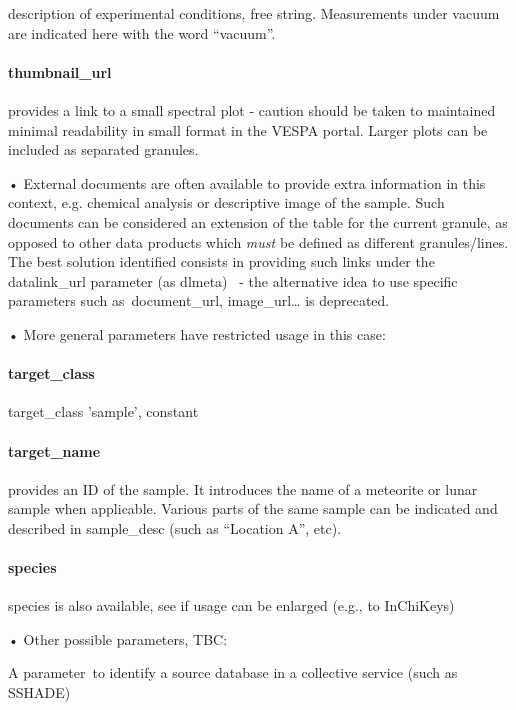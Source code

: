\documentclass[11pt,a4paper]{ivoa}
\begin{document}
description of experimental conditions, free string. Measurements under vacuum are indicated here with the word ``vacuum''.

\paragraph{\textbf{thumbnail\_url}}

provides a link to a small spectral plot - caution should be taken to maintained minimal readability in small format in the VESPA portal. Larger plots can be included as separated granules.

• External documents are often available to provide extra information in this context, e.g. chemical analysis or descriptive image of the sample. Such documents can be considered an extension of the table for the current granule, as opposed to other data products which \emph{must} be defined as different granules/lines. The best solution identified consists in providing such links under the datalink\_url parameter (as dlmeta)  - the alternative idea to use specific parameters such as document\_url, image\_url… is deprecated.

• More general parameters have restricted usage in this case:

\paragraph{target\_class\textbf{ }}

target\_class 'sample', constant

\paragraph{target\_name}

provides an ID of the sample. It introduces the name of a meteorite or lunar sample when applicable. Various parts of the same sample can be indicated and described in sample\_desc (such as ``Location A'', etc).

\paragraph{species}

species is also available, see if usage can be enlarged (e.g., to InChiKeys)

• Other possible parameters, TBC:

A parameter to identify a source database in a collective service (such as SSHADE)
\end{document}
